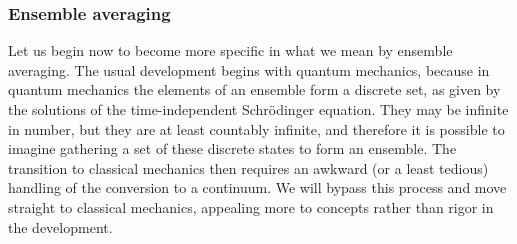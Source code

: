 \documentclass[]{article}
\begin{document}
\subsubsection{Ensemble averaging}\label{ensemble-averaging}

Let us begin now to become more specific in what we mean by ensemble
averaging. The usual development begins with quantum mechanics, because
in quantum mechanics the elements of an ensemble form a discrete set, as
given by the solutions of the time-independent Schr{\"o}dinger equation.
They may be infinite in number, but they are at least countably
infinite, and therefore it is possible to imagine gathering a set of
these discrete states to form an ensemble. The transition to classical
mechanics then requires an awkward (or a least tedious) handling of the
conversion to a continuum. We will bypass this process and move straight
to classical mechanics, appealing more to concepts rather than rigor in
the development.
\end{document}
